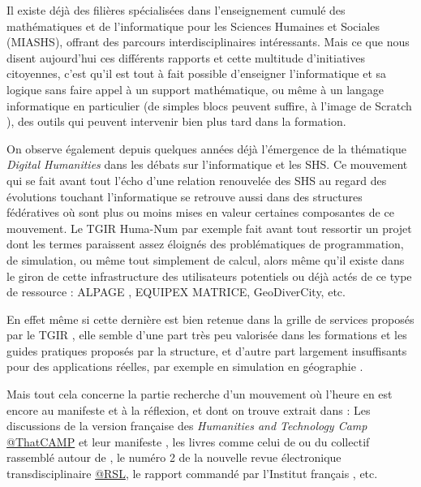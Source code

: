 Il existe déjà des filières spécialisées dans l'enseignement cumulé des mathématiques et de l'informatique pour les Sciences Humaines et Sociales (MIASHS), offrant des parcours interdisciplinaires intéressants. Mais ce que nous disent aujourd'hui ces différents rapports et cette multitude d'initiatives citoyennes, c'est qu'il est tout à fait possible d'enseigner l'informatique et sa logique sans faire appel à un support mathématique, ou même à un langage informatique en particulier (de simples blocs peuvent suffire, à l'image de Scratch \autocite{Resnick2009}), des outils qui peuvent intervenir bien plus tard dans la formation.

On observe également depuis quelques années déjà l'émergence de la thématique \textit{Digital Humanities} dans les débats sur l'informatique et les SHS. Ce mouvement  qui se fait avant tout l'écho d'une relation renouvelée des SHS au regard des évolutions touchant l'informatique  se retrouve aussi dans des structures fédératives où sont plus ou moins mises en valeur certaines composantes de ce mouvement. Le TGIR Huma-Num par exemple fait avant tout ressortir un projet dont les termes  paraissent assez éloignés des problématiques de programmation, de simulation, ou même tout simplement de calcul, alors même qu'il existe dans le giron de cette infrastructure des utilisateurs potentiels ou déjà actés de ce type de ressource : ALPAGE \autocite{Costa2012}, EQUIPEX MATRICE, GeoDiverCity, etc.

En effet même si cette dernière est bien retenue dans la grille de services proposés par le TGIR , elle semble d'une part très peu valorisée dans les formations et les guides pratiques proposés par la structure, et d'autre part largement insuffisants pour des applications réelles, par exemple en simulation en géographie .

Mais tout cela concerne la partie recherche d'un mouvement où l'heure en est encore au manifeste et à la réflexion, et dont on trouve extrait dans : Les discussions de la version française des \textit{Humanities and Technology Camp} \href{http://tcp.hypotheses.org/}{@ThatCAMP} et leur manifeste \autocite{THATCamp2010}, les livres comme celui de \textcite{Deuff2014} ou du collectif rassemblé autour de \textcite{Mounier2012}, le numéro 2 de la nouvelle revue électronique transdisciplinaire \href{http://rsl.revues.org/355}{@RSL}, le rapport commandé par l'Institut français \autocite{Dacos2015},  etc.

